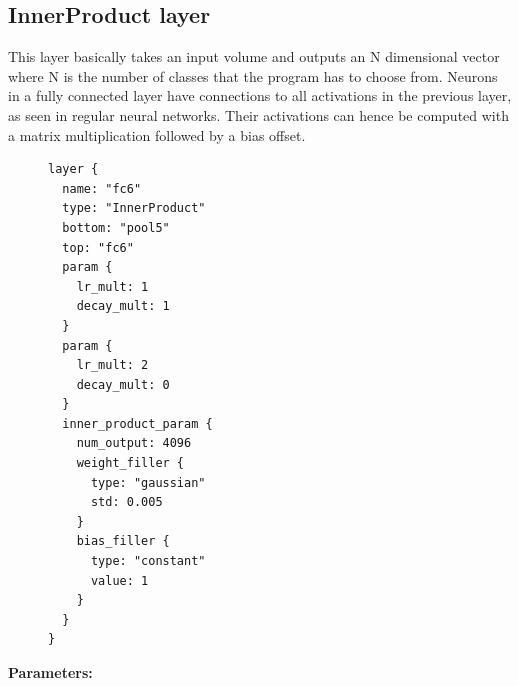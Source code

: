 \documentclass[11pt]{article}
\begin{document}
\subsection{InnerProduct layer}
This layer basically takes an input volume and outputs an N dimensional vector where N is the number of classes that the program has to choose from. Neurons in a fully connected layer have connections to all activations in the previous layer, as seen in regular neural networks. Their activations can hence be computed with a matrix multiplication followed by a bias offset.
\begin{figure}
  \begin{center}
	\begin{verbatim}
layer {
  name: "fc6"
  type: "InnerProduct"
  bottom: "pool5"
  top: "fc6"
  param {
    lr_mult: 1
    decay_mult: 1
  }
  param {
    lr_mult: 2
    decay_mult: 0
  }
  inner_product_param {
    num_output: 4096
    weight_filler {
      type: "gaussian"
      std: 0.005
    }
    bias_filler {
      type: "constant"
      value: 1
    }
  }
}
	\end{verbatim}
  \end{center}
\end{figure}
\textbf{Parameters:} 
\end{document}
